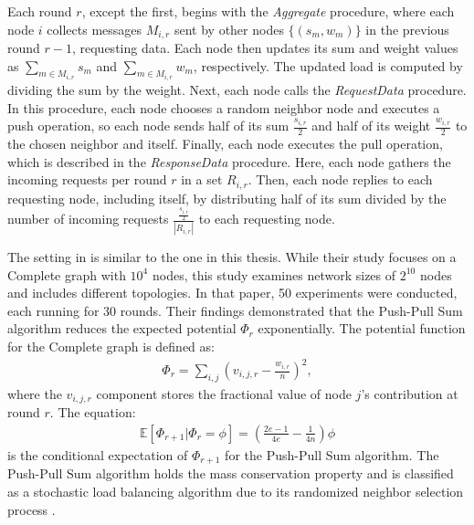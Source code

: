 Each round $r$, except the first, begins with the \textit{Aggregate} procedure, where each node $i$ collects messages $M_{i,r}$ sent by other nodes $\{(s_m, w_m)\}$ in the previous round $r-1$, requesting data. Each node then updates its sum and weight values as $\sum_{m \in M_{i,r}}{s_m}$ and $\sum_{m \in M_{i,r}}{w_m}$, respectively. The updated load is computed by dividing the sum by the weight. Next, each node calls the \textit{RequestData} procedure. In this procedure, each node chooses a random neighbor node and executes a push operation, so each node sends half of its sum $\frac{s_{i,r}}{2}$ and half of its weight $\frac{w_{i,r}}{2}$ to the chosen neighbor and itself. Finally, each node executes the pull operation, which is described in the \textit{ResponseData} procedure. Here, each node gathers the incoming requests per round $r$ in a set $R_{i, r}$. Then, each node replies to each requesting node, including itself, by distributing half of its sum divided by the number of incoming requests $\frac{\frac{s_{i,r}}{2}}{|R_{i, r}|}$ to each requesting node.



The setting in \cite{nugroho2023PushPullSumDataAg} is similar to the one in this thesis. While their study focuses on a Complete graph with $10^{4}$ nodes, this study examines network sizes of $2^{10}$ nodes and includes different topologies. In that paper, 50 experiments were conducted, each running for 30 rounds. Their findings demonstrated that the Push-Pull Sum algorithm reduces the expected potential $\Phi_r$ exponentially. The potential function for the Complete graph is defined as:
\begin{align}
    \Phi_r=\sum_{i,j}\left(v_{i,j,r}-\frac{w_{i,r}}{n}\right)^{2},  
\end{align} where the $v_{i,j,r}$ component stores the fractional value of node $j$'s contribution at round $r$. The equation: 
\begin{align}
    \mathbb{E}[\Phi_{r+1}|\Phi_r=\phi]=(\frac{2e-1}{4e}-\frac{1}{4n})\phi    
\end{align}
is the conditional expectation of $\Phi_{r+1}$ for the Push-Pull Sum algorithm. The Push-Pull Sum algorithm holds the mass conservation property and is classified as a stochastic load balancing algorithm due to its randomized neighbor selection process \cite{nugroho2023PushPullSumDataAg}.

